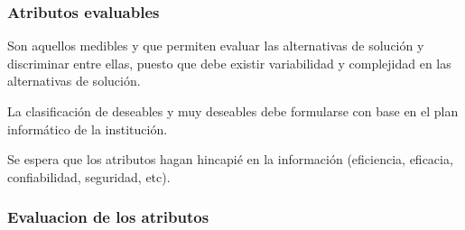 \documentclass{templateNote}
\begin{document}
\subsubsection{Atributos evaluables}
Son aquellos medibles y que permiten evaluar las alternativas de solución y discriminar entre ellas, puesto que debe existir variabilidad y complejidad en las alternativas de solución. 

La clasificación de deseables y muy deseables debe formularse con base en el plan informático de la institución.

Se espera que los atributos hagan hincapié en la información (eficiencia, eficacia, confiabilidad, seguridad, etc).

\newpage
\subsubsection{Evaluacion de los atributos}
\end{document}
